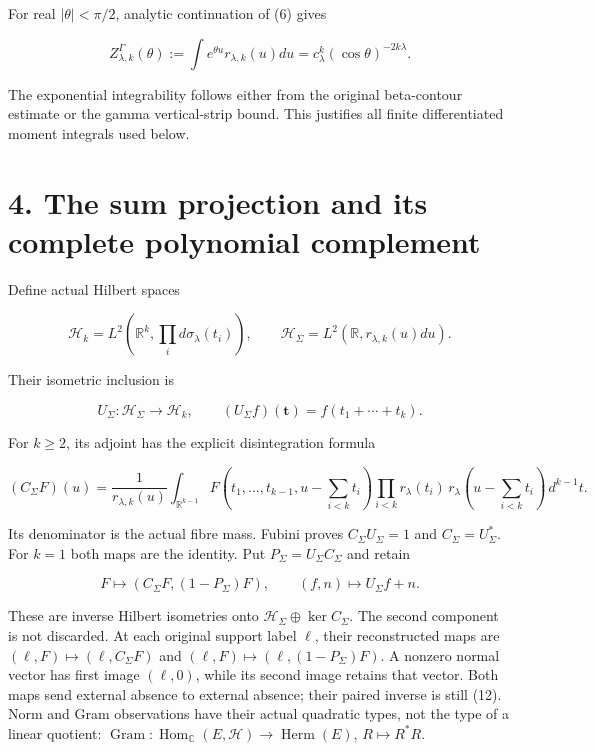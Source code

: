 \documentclass[
  11pt,
]{article}
\begin{document}
For real \(|\theta|<\pi/2\), analytic continuation of (6) gives

\[
Z_{\lambda,k}^{\Gamma}(\theta)
 :=\int e^{\theta u}r_{\lambda,k}(u)du
 =c_\lambda^k(\cos\theta)^{-2k\lambda}.                            \tag{9}
\]

The exponential integrability follows either from the original
beta-contour estimate or the gamma vertical-strip bound. This justifies
all finite differentiated moment integrals used below.

\section{4. The sum projection and its complete polynomial
complement}\label{the-sum-projection-and-its-complete-polynomial-complement}

Define actual Hilbert spaces

\[
\mathcal H_k=L^2(\mathbb R^k,\prod_i d\sigma_\lambda(t_i)),\qquad
\mathcal H_\Sigma=L^2(\mathbb R,r_{\lambda,k}(u)du).
\]

Their isometric inclusion is

\[
U_\Sigma:\mathcal H_\Sigma\to\mathcal H_k,\qquad
(U_\Sigma f)(\mathbf t)=f(t_1+\cdots+t_k).                           \tag{10}
\]

For \(k\ge2\), its adjoint has the explicit disintegration formula

\[
(C_\Sigma F)(u)=\frac{1}{r_{\lambda,k}(u)}
\int_{\mathbb R^{k-1}}
F(t_1,\ldots,t_{k-1},u-\sum_{i<k}t_i)
\prod_{i<k}r_\lambda(t_i)\,r_\lambda(u-\sum_{i<k}t_i)\,d^{k-1}t.
                                                                    \tag{11}
\]

Its denominator is the actual fibre mass. Fubini proves
\(C_\Sigma U_\Sigma=1\) and \(C_\Sigma=U_\Sigma^*\). For \(k=1\) both
maps are the identity. Put \(P_\Sigma=U_\Sigma C_\Sigma\) and retain

\[
F\longmapsto(C_\Sigma F,(1-P_\Sigma)F),\qquad
(f,n)\longmapsto U_\Sigma f+n.                                      \tag{12}
\]

These are inverse Hilbert isometries onto
\(\mathcal H_\Sigma\oplus\ker C_\Sigma\). The second component is not
discarded. At each original support label \(\ell\), their reconstructed
maps are \((\ell,F)\mapsto(\ell,C_\Sigma F)\) and
\((\ell,F)\mapsto(\ell,(1-P_\Sigma)F)\). A nonzero normal vector has
first image \((\ell,0)\), while its second image retains that vector.
Both maps send external absence to external absence; their paired
inverse is still (12). Norm and Gram observations have their actual
quadratic types, not the type of a linear quotient:
\(\operatorname{Gram}:\operatorname{Hom}_{\mathbb C}(E,\mathcal H)
\to\operatorname{Herm}(E)\), \(R\mapsto R^*R\).
\end{document}
